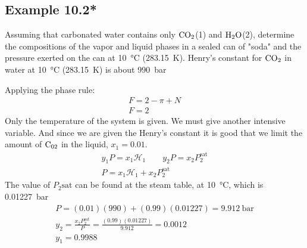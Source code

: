 \documentclass[../main.tex]{subfiles}
\begin{document}
\subsection*{Example 10.2*}
%
Assuming that carbonated water contains only $\ce{CO2}$(1) and
$\ce{H2O}$(2), determine the compositions of the vapor and liquid
phases in a sealed can of "soda" and the pressure exerted on the can
at 10~\unit{\degreeCelsius} (283.15~\unit{\kelvin}). Henry's constant
for $\ce{CO2}$ in water at 10~\unit{\degreeCelsius}
(283.15~\unit{\kelvin}) is about 990~\unit{\bar}
%
\begin{solution}%
  Applying the phase rule:
  \begin{gather*}%
    F = 2 - \pi + N \\
    F = 2
  \end{gather*}
  Only the temperature of the system is given. We must give another
  intensive variable. And since we are given the Henry's constant it
  is good that we limit the amount of $\ce{C02}$ in the liquid, $x_{1}=0.01$.
  \begin{gather*}%
    y_{1}P = x_{1}\mathcal{H}_{1} \qquad y_{2}P = x_{2}P_{2}^{\text{sat}}\\
    P = x_{1}\mathcal{H}_{1} + x_{2}P_{2}^{\text{sat}}
  \end{gather*}
  The value of $P_{2}\text{sat}$ can be found at the steam table, at
  10~\unit{\degreeCelsius}, which is 0.01227~\unit{\bar}
  \begin{gather*}%
    P = (0.01)(990) + (0.99)(0.01227) = \boxed{9.912~\unit{\bar}}\\
    y_{2} = \frac{x_{2}P_{2}^{\text{sat}}}{P} =
    \frac{(0.99)(0.01227)}{9.912} = \boxed{0.0012}\\
    y_{1} = \boxed{0.9988}
  \end{gather*}
\end{solution}
%

%
\end{document}
